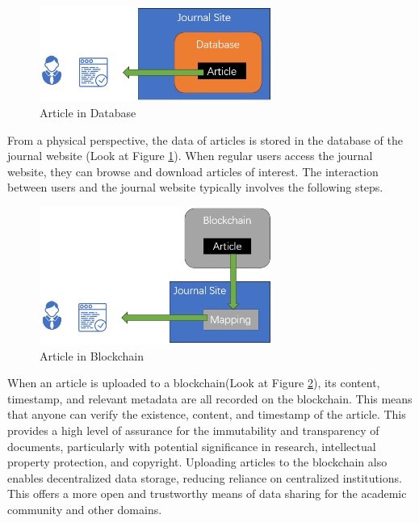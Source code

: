 \documentclass[lettersize,journal]{IEEEtran}
\begin{document}
\begin{figure}[h]
  \centering
  \includegraphics[width=3in]{assets/journalsite.png}
  \caption{Article in Database}
  \label{fig:journalsite}
\end{figure}

From a physical perspective, the data of articles is stored in the database of the journal website (Look at Figure \ref{fig:journalsite}). When regular users access the journal website, they can browse and download articles of interest. The interaction between users and the journal website typically involves the following steps.


\begin{figure}[h]
  \centering
  \includegraphics[width=3in]{assets/journalchain.png}
  \caption{Article in Blockchain}
  \label{fig:journalchain}
\end{figure}

When an article is uploaded to a blockchain(Look at Figure \ref{fig:journalchain}), its content, timestamp, and relevant metadata are all recorded on the blockchain. This means that anyone can verify the existence, content, and timestamp of the article. This provides a high level of assurance for the immutability and transparency of documents, particularly with potential significance in research, intellectual property protection, and copyright. Uploading articles to the blockchain also enables decentralized data storage, reducing reliance on centralized institutions. This offers a more open and trustworthy means of data sharing for the academic community and other domains.
\end{document}
